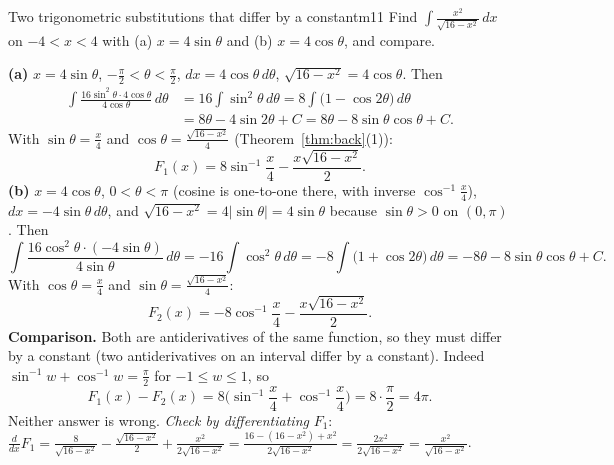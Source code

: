 \documentclass[11pt]{article}
\begin{document}
\begin{exmp}{Two trigonometric substitutions that differ by a constant}{m11}
Find $\displaystyle\int\frac{x^2}{\sqrt{16-x^2}}\,dx$ on $-4<x<4$ with (a) $x=4\sin\theta$ and (b) $x=4\cos\theta$, and compare.

\textbf{(a)} $x=4\sin\theta$, $-\frac\pi2<\theta<\frac\pi2$, $dx=4\cos\theta\,d\theta$, $\sqrt{16-x^2}=4\cos\theta$. Then
\begin{align*}
\int\frac{16\sin^2\theta\cdot4\cos\theta}{4\cos\theta}\,d\theta&=16\int\sin^2\theta\,d\theta=8\int\big(1-\cos2\theta\big)\,d\theta\\
&=8\theta-4\sin2\theta+C=8\theta-8\sin\theta\cos\theta+C .
\end{align*}
With $\sin\theta=\frac x4$ and $\cos\theta=\frac{\sqrt{16-x^2}}4$ (Theorem~\ref{thm:back}(1)):
\[F_1(x)=8\sin^{-1}\frac x4-\frac{x\sqrt{16-x^2}}2 .\]
\textbf{(b)} $x=4\cos\theta$, $0<\theta<\pi$ (cosine is one-to-one there, with inverse $\cos^{-1}\frac x4$), $dx=-4\sin\theta\,d\theta$, and $\sqrt{16-x^2}=4\lvert\sin\theta\rvert=4\sin\theta$ because $\sin\theta>0$ on $(0,\pi)$. Then
\[\int\frac{16\cos^2\theta\cdot(-4\sin\theta)}{4\sin\theta}\,d\theta=-16\int\cos^2\theta\,d\theta=-8\int\big(1+\cos2\theta\big)\,d\theta=-8\theta-8\sin\theta\cos\theta+C .\]
With $\cos\theta=\frac x4$ and $\sin\theta=\frac{\sqrt{16-x^2}}4$:
\[F_2(x)=-8\cos^{-1}\frac x4-\frac{x\sqrt{16-x^2}}2 .\]
\textbf{Comparison.} Both are antiderivatives of the same function, so they must differ by a constant (two antiderivatives on an interval differ by a constant). Indeed $\sin^{-1}w+\cos^{-1}w=\frac\pi2$ for $-1\le w\le1$, so
\[F_1(x)-F_2(x)=8\Big(\sin^{-1}\frac x4+\cos^{-1}\frac x4\Big)=8\cdot\frac\pi2=4\pi .\]
Neither answer is wrong. \emph{Check by differentiating} $F_1$: $\frac{d}{dx}F_1=\frac8{\sqrt{16-x^2}}-\frac{\sqrt{16-x^2}}2+\frac{x^2}{2\sqrt{16-x^2}}=\frac{16-(16-x^2)+x^2}{2\sqrt{16-x^2}}=\frac{2x^2}{2\sqrt{16-x^2}}=\frac{x^2}{\sqrt{16-x^2}}$.
\end{exmp}
\end{document}
